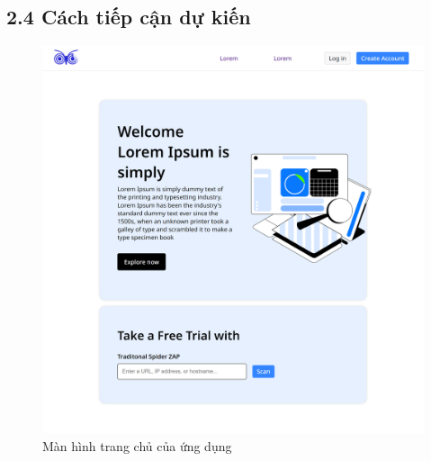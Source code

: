 \subsection*{2.4  Cách tiếp cận dự kiến}
\begin{figure}[H]
    \centering
    \includegraphics[width=\textwidth]{images/prototype/prototype_22112022/home.png}
    \caption{Màn hình trang chủ của ứng dụng}
\end{figure}

